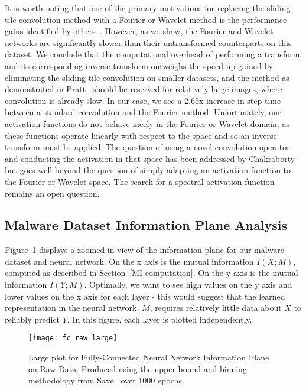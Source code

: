 It is worth noting that one of the primary motivations for replacing the sliding-tile convolution method with a Fourier or Wavelet method is the performance gains identified by others~\cite{pratt2017fcnn}.
However, as we show, the Fourier and Wavelet networks are significantly slower than their untransformed counterparts on this dataset.
We conclude that the computational overhead of performing a transform and its corresponding inverse transform outweighs the speed-up gained by eliminating the sliding-tile convolution on smaller datasets, and the method as demonstrated in Pratt~\cite{pratt2017fcnn} should be reserved for relatively large images, where convolution is already slow.
In our case, we see a 2.65x increase in step time between a standard convolution and the Fourier method. 
Unfortunately, our activation functions do not behave nicely in the Fourier or Wavelet domain, as these functions operate linearly with respect to the space and so an inverse transform must be applied. 
The question of using a novel convolution operator and conducting the activation in that space has been addressed by Chakraborty~\cite{chakraborty2019surreal} but goes well beyond the question of simply adapting an activation function to the Fourier or Wavelet space.
The search for a spectral activation function remains an open question.

\subsection{Malware Dataset Information Plane Analysis}\label{infoplane}
Figure~\ref{fig:infoplane example} displays a zoomed-in view of the information plane for our malware dataset and neural network.
On the x axis is the mutual information $I(X;M)$, computed as described in Section~\ref{MI computation}.
On the y axis is the mutual information $I(Y;M)$. 
Optimally, we want to see high values on the y axis and lower values on the x axis for each layer - this would suggest that the learned representation in the neural network, $M$, requires relatively little data about $X$ to reliably predict $Y$.
In this figure, each layer is plotted independently. 

\begin{figure}[h!]
\begin{center}
\texttt{[image: fc\_raw\_large]}
\caption{Large plot for Fully-Connected Neural Network Information Plane on Raw Data. Produced using the upper bound and binning methodology from Saxe~\cite{saxe2019information} over 1000 epochs.}
\label{fig:infoplane example}
\centering
\end{center}
\end{figure}

